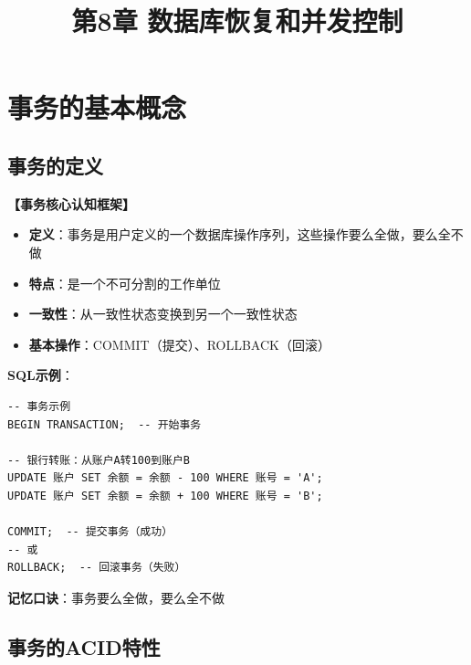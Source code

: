 \documentclass[12pt, a4paper]{article}
\title{\textbf{第8章 数据库恢复和并发控制}}
\date{}
\newenvironment{bluebox}[1]{%
  \begin{trivlist}
  \item[\hskip\labelsep \textbf{#1}]
  \setlength{\parskip}{0.5ex}
  \setlength{\itemsep}{0.5ex}
}{%
  \end{trivlist}
  }
\begin{document}
\maketitle
\thispagestyle{empty}
\newpage

\section{事务的基本概念}

\subsection{事务的定义}

\begin{bluebox}{核心概念框架}
	\textbf{【事务核心认知框架】}

	\begin{itemize}[leftmargin=*, nosep]
		\item \textbf{定义}：事务是用户定义的一个数据库操作序列，这些操作要么全做，要么全不做
		\item \textbf{特点}：是一个不可分割的工作单位
		\item \textbf{一致性}：从一致性状态变换到另一个一致性状态
		\item \textbf{基本操作}：COMMIT（提交）、ROLLBACK（回滚）
	\end{itemize}

	\textbf{SQL示例}：
	\begin{verbatim}
-- 事务示例
BEGIN TRANSACTION;  -- 开始事务

-- 银行转账：从账户A转100到账户B
UPDATE 账户 SET 余额 = 余额 - 100 WHERE 账号 = 'A';
UPDATE 账户 SET 余额 = 余额 + 100 WHERE 账号 = 'B';

COMMIT;  -- 提交事务（成功）
-- 或
ROLLBACK;  -- 回滚事务（失败）
	\end{verbatim}

	\textbf{记忆口诀}：事务要么全做，要么全不做
\end{bluebox}

\subsection{事务的ACID特性}
\end{document}

